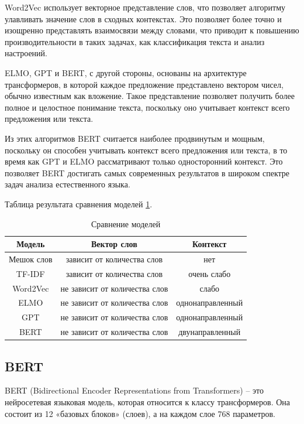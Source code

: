 \documentclass[PI, VKR]{HSEUniversity}
\begin{document}
Word2Vec использует векторное представление слов, что позволяет алгоритму улавливать значение слов в сходных контекстах. Это позволяет более точно и изощренно представлять взаимосвязи между словами, что приводит к повышению производительности в таких задачах, как классификация текста и анализ настроений.

ELMO, GPT и BERT, с другой стороны, основаны на архитектуре трансформеров, в которой каждое предложение представлено вектором чисел, обычно известным как вложение. Такое представление позволяет получить более полное и целостное понимание текста, поскольку оно учитывает контекст всего предложения или текста.

Из этих алгоритмов BERT считается наиболее продвинутым и мощным, поскольку он способен учитывать контекст всего предложения или текста, в то время как GPT и ELMO рассматривают только односторонний контекст. Это позволяет BERT достигать самых современных результатов в широком спектре задач анализа естественного языка.

Таблица результата сравнения моделей \ref{tbl:model_compare}.
\begin{table}[h!]
\caption{\label{tbl:model_compare}Сравнение моделей}
\centering
\begin{tabular}{|c|c|c|}
\hline
Модель & Вектор слов & Контекст\\[0pt]
\hline
Мешок слов & зависит от количества слов & нет\\[0pt]
\hline
TF-IDF & зависит от количества слов & очень слабо\\[0pt]
\hline
Word2Vec & не зависит от количества слов & слабо\\[0pt]
\hline
ELMO & не зависит от количества слов & однонаправленный\\[0pt]
\hline
GPT & не зависит от количества слов & однонаправленный\\[0pt]
\hline
BERT & не зависит от количества слов & двунаправленный\\[0pt]
\hline
\end{tabular}
\end{table}

\subsection{BERT}
\label{sec:orgc6306c8}
BERT \autocite{devlin_bert_2019} (Bidirectional Encoder Representations from Transformers) -- это нейросетевая языковая модель, которая относится к классу трансформеров. Она состоит из 12 «базовых блоков» (слоев), а на каждом слое 768 параметров.
\end{document}
